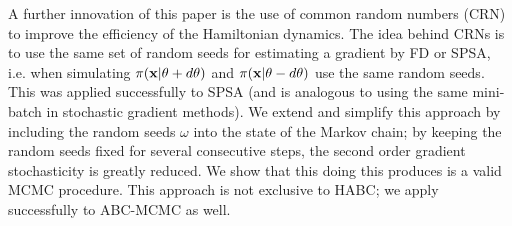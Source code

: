\documentclass[]{article}
\begin{document}



A further innovation of this paper is the use of common random numbers (CRN) to improve the efficiency of the Hamiltonian dynamics.  The idea behind CRNs is to use the same set of random seeds for estimating a gradient by FD or SPSA, i.e. when simulating $\pi({\bf x}| \theta + d\theta)$ and $\pi({\bf x}| \theta - d\theta)$ use the same random seeds.  This was applied successfully to SPSA \cite{kleinman1999simulation} (and is analogous to using the same mini-batch in stochastic gradient methods).  We extend and simplify this approach by including the random seeds $\omega$ into the state of the Markov chain;  by keeping the random seeds fixed for several consecutive steps, the second order gradient stochasticity is greatly reduced.  We show that this doing this produces is a valid MCMC procedure.  This approach is not exclusive to HABC; we apply successfully to ABC-MCMC as well.  
 
\end{document}

